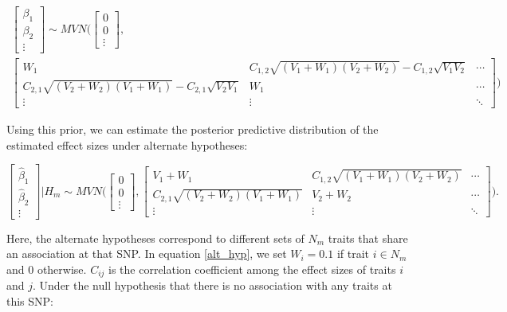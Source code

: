 \documentclass{article}
\begin{document}
\begin{multline}
\begin{bmatrix}
\beta_1 \\
\beta_2 \\
\vdots
\end{bmatrix}
\sim MVN \Bigg(
\begin{bmatrix}
0 \\
0 \\
\vdots
\end{bmatrix}, \\
\begin{bmatrix}
W_1 & C_{1,2} \sqrt{(V_1 + W_1)(V_2 + W_2)} - C_{1,2} \sqrt{V_1 V_2} & \cdots \\
C_{2,1} \sqrt{(V_2 + W_2) (V_1 + W_1)} - C_{2,1} \sqrt{V_2 V_1} & W_1 & \cdots \\
\vdots & \vdots & \ddots
\end{bmatrix}
\Bigg)
\end{multline}

\noindent Using this prior, we can estimate the posterior predictive distribution of the estimated effect sizes under alternate hypotheses:

\begin{equation}
\label{alt_hyp}
\begin{bmatrix}
\hat{\beta}_1 \\
\hat{\beta}_2 \\
\vdots
\end{bmatrix} | H_m
\sim MVN \Bigg(
\begin{bmatrix}
0 \\
0 \\
\vdots
\end{bmatrix},
\begin{bmatrix}
V_1 + W_1 & C_{1,2} \sqrt{(V_1 + W_1) (V_2 + W_2)} & \cdots \\
C_{2,1} \sqrt{(V_2 + W_2) (V_1 + W_1)} & V_2 + W_2 & \cdots \\
\vdots & \vdots & \ddots
\end{bmatrix}
\Bigg).
\end{equation}

\noindent Here, the alternate hypotheses correspond to different sets of $N_m$ traits that share an association at that SNP. In equation \ref{alt_hyp}, we set $W_i = 0.1$ if trait $i \in N_m$ and 0 otherwise. $C_{ij}$ is the correlation coefficient among the effect sizes of traits $i$ and $j$. Under the null hypothesis that there is no association with any traits at this SNP:
\end{document}
